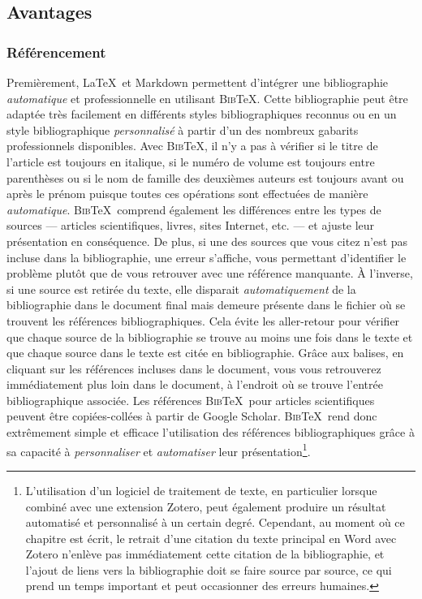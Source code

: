 \documentclass[
  letterpaper,
]{scrbook}
\begin{document}
\hypertarget{avantages-2}{%
\subsection{Avantages}\label{avantages-2}}

\hypertarget{ruxe9fuxe9rencement}{%
\subsubsection{Référencement}\label{ruxe9fuxe9rencement}}

Premièrement, \LaTeX~et Markdown permettent d'intégrer une bibliographie
\emph{automatique} et professionnelle en utilisant \textsc{Bib}\TeX.
Cette bibliographie peut être adaptée très facilement en différents
styles bibliographiques reconnus ou en un style bibliographique
\emph{personnalisé} à partir d'un des nombreux gabarits professionnels
disponibles. Avec \textsc{Bib}\TeX, il n'y a pas à vérifier si le titre
de l'article est toujours en italique, si le numéro de volume est
toujours entre parenthèses ou si le nom de famille des deuxièmes auteurs
est toujours avant ou après le prénom puisque toutes ces opérations sont
effectuées de manière \emph{automatique}. \textsc{Bib}\TeX~comprend
également les différences entre les types de sources --- articles
scientifiques, livres, sites Internet, etc. --- et ajuste leur
présentation en conséquence. De plus, si une des sources que vous citez
n'est pas incluse dans la bibliographie, une erreur s'affiche, vous
permettant d'identifier le problème plutôt que de vous retrouver avec
une référence manquante. À l'inverse, si une source est retirée du
texte, elle disparait \emph{automatiquement} de la bibliographie dans le
document final mais demeure présente dans le fichier où se trouvent les
références bibliographiques. Cela évite les aller-retour pour vérifier
que chaque source de la bibliographie se trouve au moins une fois dans
le texte et que chaque source dans le texte est citée en bibliographie.
Grâce aux balises, en cliquant sur les références incluses dans le
document, vous vous retrouverez immédiatement plus loin dans le
document, à l'endroit où se trouve l'entrée bibliographique associée.
Les références \textsc{Bib}\TeX~pour articles scientifiques peuvent être
copiées-collées à partir de Google Scholar. \textsc{Bib}\TeX~rend donc
extrêmement simple et efficace l'utilisation des références
bibliographiques grâce à sa capacité à \emph{personnaliser} et
\emph{automatiser} leur présentation\footnote{L'utilisation d'un
  logiciel de traitement de texte, en particulier lorsque combiné avec
  une extension Zotero, peut également produire un résultat automatisé
  et personnalisé à un certain degré. Cependant, au moment où ce
  chapitre est écrit, le retrait d'une citation du texte principal en
  Word avec Zotero n'enlève pas immédiatement cette citation de la
  bibliographie, et l'ajout de liens vers la bibliographie doit se faire
  source par source, ce qui prend un temps important et peut occasionner
  des erreurs humaines.}.
\end{document}
